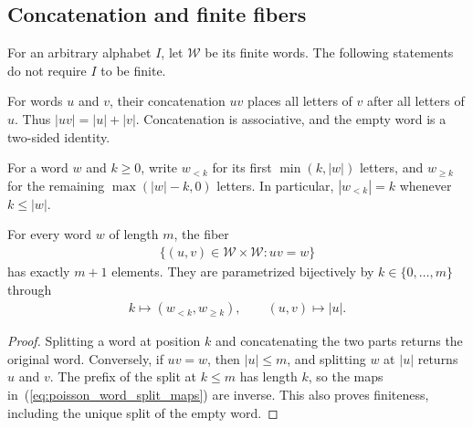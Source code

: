 \subsection{Concatenation and finite fibers}
\label{sec:poisson_word_append}

For an arbitrary alphabet $I$, let $\mathcal W$ be its finite words.
The following statements do not require $I$ to be finite.

\begin{definition}
\label{def:poisson_word_append}
\leanok
{}
For words $u$ and $v$, their concatenation $uv$ places all letters of $v$
after all letters of $u$.  Thus $|uv|=|u|+|v|$.
Concatenation is associative, and the empty word is a two-sided identity.
\end{definition}

\begin{definition}
\label{def:poisson_word_split}
\leanok
{}
For a word $w$ and $k\geq0$, write $w_{<k}$ for its first
$\min(k,|w|)$ letters, and $w_{\geq k}$ for the remaining
$\max(|w|-k,0)$ letters.  In particular,
$|w_{<k}|=k$ whenever $k\leq|w|$.
\end{definition}

\begin{lemma}
\label{lem:poisson_word_append_fiber}
\leanok
{}
For every word $w$ of length $m$, the fiber
\begin{align}
 \{(u,v)\in\mathcal W\times\mathcal W:uv=w\}
 \label{eq:poisson_word_append_fiber}
\end{align}
has exactly $m+1$ elements.  They are parametrized bijectively by
$k\in\{0,\ldots,m\}$ through
\begin{align}
 k\longmapsto (w_{<k},w_{\geq k}),
 \qquad (u,v)\longmapsto |u|.
 \label{eq:poisson_word_split_maps}
\end{align}
\end{lemma}
\begin{proof}
\leanok
Splitting a word at position $k$ and concatenating the two parts returns
the original word.  Conversely, if $uv=w$, then $|u|\leq m$,
and splitting $w$ at $|u|$ returns $u$ and $v$.  The prefix of the split
at $k\leq m$ has length $k$, so the maps
in~(\ref{eq:poisson_word_split_maps}) are inverse.
This also proves finiteness, including the unique split of the empty word.
\end{proof}
